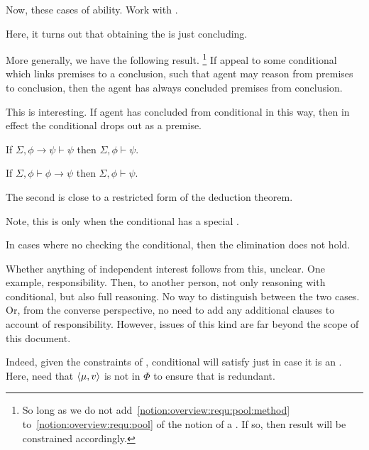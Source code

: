 \subsubsection{\adB{}}
\label{sec:tension:adb}

\begin{note}
  Now, these cases of ability.
  Work with \adB{}.
\end{note}

\begin{note}
  Here, it turns out that obtaining the \itp{} is just concluding.
\end{note}

\begin{note}
  More generally, we have the following result.\nolinebreak
  \footnote{
    So long as we do not add~\autoref{notion:overview:requ:pool:method} to~\autoref{notion:overview:requ:pool} of the notion of a \requ{}.
    If so, then result will be constrained accordingly.
  }
  If appeal to some conditional which links premises to a conclusion, such that agent may reason from premises to conclusion, then the agent has always concluded premises from conclusion.

  This is interesting.
  If agent has concluded from conditional in this way, then in effect the conditional drops out as a premise.

  If \(\Sigma, \phi \rightarrow \psi \vdash \psi\) then \(\Sigma, \phi \vdash \psi\).

  If \(\Sigma, \phi \vdash \phi \rightarrow \psi\) then \(\Sigma, \phi \vdash \psi\).

  The second is close to a restricted form of the deduction theorem.

  Note, this is only when the conditional has a special \requ{}.

  In cases where no checking the conditional, then the elimination does not hold.

  Whether anything of independent interest follows from this, unclear.
  One example, responsibility.
  Then, to another person, not only reasoning with conditional, but also full reasoning.
  No way to distinguish between the two cases.
  Or, from the converse perspective, no need to add any additional clauses to account of responsibility.
  However, issues of this kind are far beyond the scope of this document.
\end{note}

\begin{note}
  Indeed, given the constraints of , conditional will satisfy just in case it is an \itp{}.
  Here, need that \(\langle \mu, v \rangle\) is not in \(\Phi\) to ensure that  is redundant.
\end{note}

